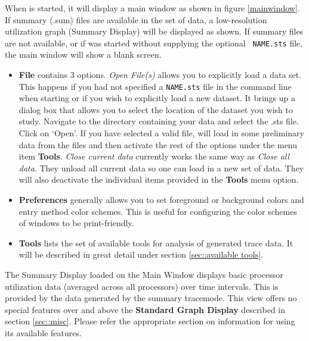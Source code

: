 \documentclass[10pt]{article}
\begin{document}
When \projections{} is started, it will display a main window as shown
in figure \ref{mainwindow}. If summary (.sum) files are available in
the set of data, a low-resolution utilization graph (Summary Display)
will be displayed as shown. If summary files are not available, or if
\projections{} was started without supplying the optional {\tt
NAME.sts} file, the main window will show a blank screen.


\begin{itemize}
\item
  {\bf File} contains 3 options. {\it Open File(s)} allows you to
  explicitly load a data set. This happens if you had not specified a
  {\tt NAME.sts} file in the command line when starting \projections{}
  or if you wish to explicitly load a new dataset. It brings up a
  dialog box that allows you to select the location of the dataset you
  wish to study. Navigate to the directory containing your data and
  select the .sts file.  Click on `Open'. If you have selected a valid
  file, \projections{} will load in some preliminary data from the
  files and then activate the rest of the options under the menu item
  {\bf Tools}. {\it Close current data} currently works the same way
  as {\it Close all data}. They unload all current \projections{} data
  so one can load in a new set of data. They will also deactivate the
  individual items provided in the {\bf Tools} menu option.
\item
  {\bf Preferences} generally allows you to set foreground or background
  colors and entry method color schemes. This is useful for configuring
  the color schemes of \projections{} windows to be print-friendly.
\item
  {\bf Tools} lists the set of available tools for analysis of generated
  trace data. It will be described in great detail under section
  \ref{sec::available tools}.
\end{itemize}


The Summary Display loaded on the Main Window displays basic processor
utilization data (averaged across all processors) over time
intervals. This is provided by the data generated by the summary
tracemode. This view offers no special features over and above the
{\bf Standard Graph Display} described in section \ref{sec::misc}. 
Please refer the appropriate section on information for using
its available features.

\end{document}
